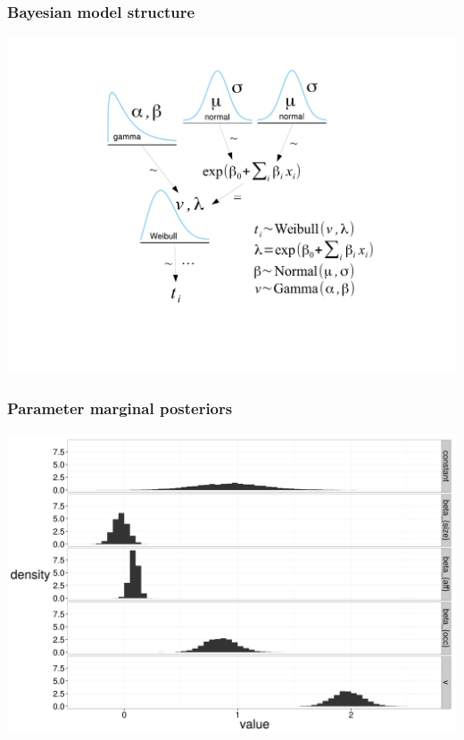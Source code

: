 \documentclass{beamer}
\begin{document}
\begin{frame}
  \frametitle{Bayesian model structure}
  \begin{center}
    \includegraphics[height = 0.8\textheight, width = \textwidth, keepaspectratio = true]{figure/surv_mod}
  \end{center}
\end{frame}


\begin{frame}
  \frametitle{Parameter marginal posteriors}
  \begin{center}
    \includegraphics[height = 0.8\textheight, width = \textwidth, keepaspectratio = true]{figure/post}
  \end{center}
\end{frame}
\end{document}
